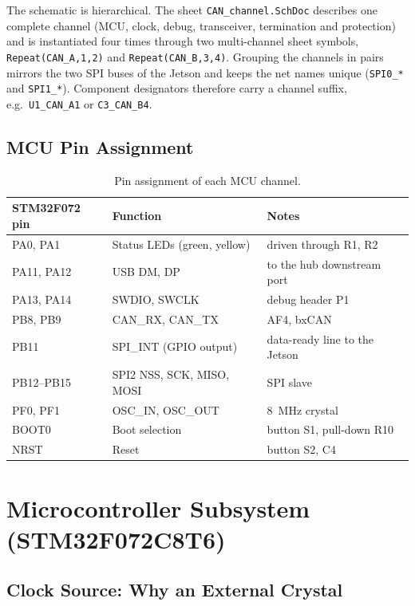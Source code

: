\documentclass[11pt,a4paper]{article}
\begin{document}
The schematic is hierarchical. The sheet \texttt{CAN\_channel.SchDoc} describes one complete channel
(MCU, clock, debug, transceiver, termination and protection) and is instantiated four times
through two multi-channel sheet symbols, \texttt{Repeat(CAN\_A,1,2)} and \texttt{Repeat(CAN\_B,3,4)}. Grouping
the channels in pairs mirrors the two SPI buses of the Jetson and keeps the net names unique
(\texttt{SPI0\_*} and \texttt{SPI1\_*}). Component designators therefore carry a channel suffix, e.g.\ \texttt{U1\_CAN\_A1}
or \texttt{C3\_CAN\_B4}.

\subsection{MCU Pin Assignment}

\begin{table}[H]
\centering
\begin{tabular}{lll}
\toprule
STM32F072 pin & Function & Notes \\
\midrule
PA0, PA1   & Status LEDs (green, yellow)  & driven through R1, R2 \\
PA11, PA12 & USB DM, DP                   & to the hub downstream port \\
PA13, PA14 & SWDIO, SWCLK                 & debug header P1 \\
PB8, PB9   & CAN\_RX, CAN\_TX             & AF4, bxCAN \\
PB11       & SPI\_INT (GPIO output)       & data-ready line to the Jetson \\
PB12--PB15 & SPI2 NSS, SCK, MISO, MOSI    & SPI slave \\
PF0, PF1   & OSC\_IN, OSC\_OUT            & \qty{8}{MHz} crystal \\
BOOT0      & Boot selection               & button S1, pull-down R10 \\
NRST       & Reset                        & button S2, C4 \\
\bottomrule
\end{tabular}
\caption{Pin assignment of each MCU channel.}
\label{tab:pins}
\end{table}

\newpage
\section{Microcontroller Subsystem (STM32F072C8T6)}

\subsection{Clock Source: Why an External Crystal}\label{sec:clock}
\end{document}
